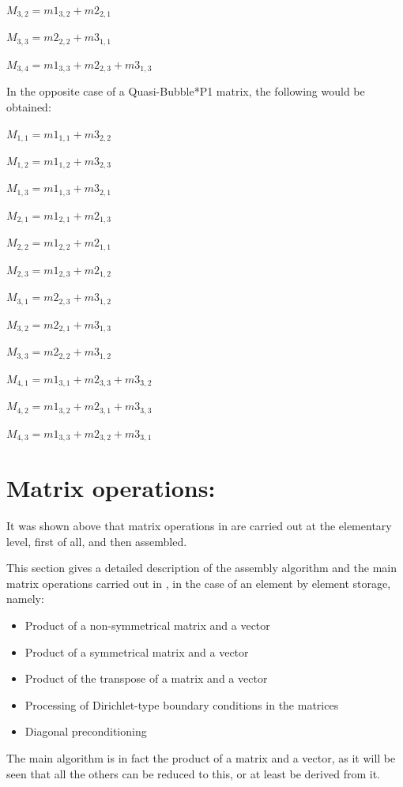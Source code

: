 $M_{3,2} = m1_{3,2} + m2_{2,1}$

$M_{3,3} = m2_{2,2} + m3_{1,1}$

$M_{3,4} = m1_{3,3} + m2_{2,3} + m3_{1,3}$

In the opposite case of a Quasi-Bubble*P1 matrix, the following would be obtained:

$M_{1,1} = m1_{1,1} + m3_{2,2}$

$M_{1,2} = m1_{1,2} + m3_{2,3}$

$M_{1,3} = m1_{1,3} + m3_{2,1}$

$M_{2,1} = m1_{2,1} + m2_{1,3}$

$M_{2,2} = m1_{2,2} + m2_{1,1}$

$M_{2,3} = m1_{2,3} + m2_{1,2}$

$M_{3,1} = m2_{2,3} + m3_{1,2}$

$M_{3,2} = m2_{2,1} + m3_{1,3}$

$M_{3,3} = m2_{2,2} + m3_{1,2}$

$M_{4,1} = m1_{3,1} + m2_{3,3} + m3_{3,2}$

$M_{4,2} = m1_{3,2} + m2_{3,1} + m3_{3,3}$

$M_{4,3} = m1_{3,3} + m2_{3,2} + m3_{3,1}$

\section{Matrix operations:}

It was shown above that matrix operations in \bief are carried out at the elementary
level, first of all, and then assembled.

This section gives a detailed description of the assembly algorithm and the
main matrix operations carried out in \bief, in the case of an element by
element storage, namely:
\begin{itemize}
  \item Product of a non-symmetrical matrix and a vector
  \item Product of a symmetrical matrix and a vector
  \item Product of the transpose of a matrix and a vector
  \item Processing of Dirichlet-type boundary conditions in the matrices
  \item Diagonal preconditioning
\end{itemize}

The main algorithm is in fact the product of a matrix and a vector, as it will
be seen that all the others can be reduced to this, or at least be derived from
it.

